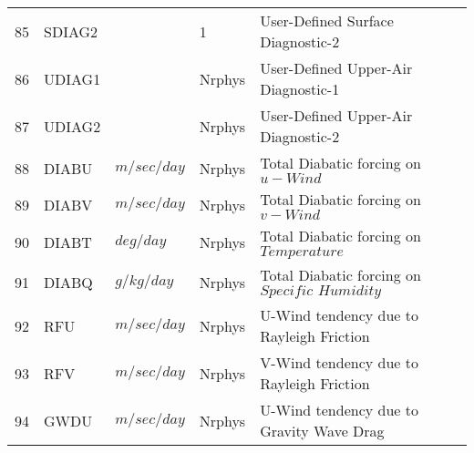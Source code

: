 \begin{tabular}{lllll}
85 & SDIAG2   &             &    1  
         &\begin{minipage}[t]{3in}
          {User-Defined Surface Diagnostic-2} 
         \end{minipage}\\
86 & UDIAG1   &             &    Nrphys
         &\begin{minipage}[t]{3in}
          {User-Defined Upper-Air Diagnostic-1} 
         \end{minipage}\\
87 & UDIAG2   &             &    Nrphys
         &\begin{minipage}[t]{3in}
          {User-Defined Upper-Air Diagnostic-2} 
         \end{minipage}\\
88 & DIABU    & $m/sec/day$ &    Nrphys
         &\begin{minipage}[t]{3in}
          {Total Diabatic forcing on $u-Wind$} 
         \end{minipage}\\
89 & DIABV    & $m/sec/day$ &    Nrphys
         &\begin{minipage}[t]{3in}
          {Total Diabatic forcing on $v-Wind$} 
         \end{minipage}\\
90 & DIABT    & $deg/day$ &    Nrphys
         &\begin{minipage}[t]{3in}
          {Total Diabatic forcing on $Temperature$} 
         \end{minipage}\\
91 & DIABQ    & $g/kg/day$ &    Nrphys
         &\begin{minipage}[t]{3in}
          {Total Diabatic forcing on $Specific \, \, Humidity$} 
         \end{minipage}\\
92 & RFU      &    $m/sec/day$ &  Nrphys
         &\begin{minipage}[t]{3in}
          {U-Wind tendency due to Rayleigh Friction}
         \end{minipage}\\
93 & RFV      &    $m/sec/day$ &  Nrphys
         &\begin{minipage}[t]{3in}
          {V-Wind tendency due to Rayleigh Friction}
         \end{minipage}\\
94 & GWDU     &    $m/sec/day$ &  Nrphys
         &\begin{minipage}[t]{3in}
          {U-Wind tendency due to Gravity Wave Drag}

\end{minipage}
\end{tabular}
